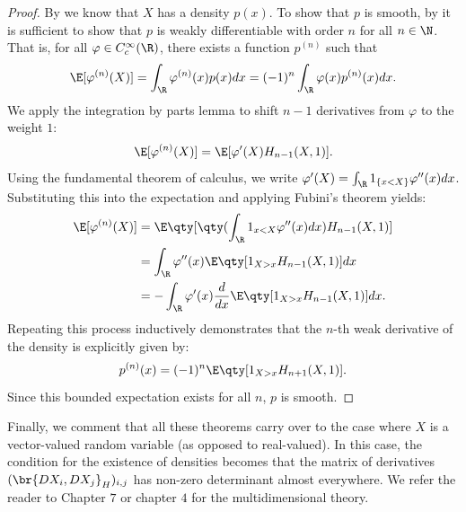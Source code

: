 \documentclass[
    a4paper,
    DIV=14,
    abstract=true,
    numbers=noenddot
]{scrartcl}
\begin{document}
\begin{proof}
By  we know that $X$ has a density $p(x)$. To show that $p$ is smooth, by  it is sufficient to show that $p$ is weakly differentiable with order $n$ for all $n \in \N$. That is, for all $\varphi\in C_c^\infty(\R)$, there exists a function $p^{(n)}$ such that
\begin{equation*}
\E[\varphi^{(n)}(X)]=\int_{\R}\varphi^{(n)}(x)p(x) dx=(-1)^n\int_{\R}\varphi(x) p^{(n)}(x) dx.
\end{equation*}
We apply the integration by parts lemma to shift $n-1$ derivatives from $\varphi$ to the weight $1$:
\begin{equation*}
\E[\varphi^{(n)}(X)] = \E[\varphi'(X)H_{n-1}(X,1)].
\end{equation*}
Using the fundamental theorem of calculus, we write $\varphi'(X) = \int_{\R} 1_{\{x < X\}} \varphi''(x) dx$. Substituting this into the expectation and applying Fubini's theorem yields:
\begin{align*}
\E[\varphi^{(n)}(X)] &= \E\qty[\qty(\int_{\R} 1_{{x < X}} \varphi''(x) dx) H_{n-1}(X,1)] \\
&= \int_{\R} \varphi''(x) \E\qty[1_{{X > x}} H_{n-1}(X,1)] dx \\
&= -\int_{\R} \varphi'(x) \frac{d}{dx} \E\qty[1_{{X > x}} H_{n-1}(X,1)] dx.
\end{align*}
Repeating this process inductively demonstrates that the $n$-th weak derivative of the density is explicitly given by:
\begin{equation*}
p^{(n)}(x) = (-1)^n \E\qty[1_{{X > x}} H_{n+1}(X,1)].
\end{equation*}
Since this bounded expectation exists for all $n$, $p$ is smooth.
\end{proof}
	Finally, we comment that all these theorems carry over to the case where $X$ is a vector-valued random variable (as opposed to real-valued). In this case, the condition
	for the existence of densities becomes that the matrix of derivatives $(\br{DX_i,DX_j}_{H})_{i,j}$ has non-zero determinant almost everywhere. We refer the reader to \cite{nualart2018introduction} 
	Chapter  $7$ or \cite{hairer2021introduction}  chapter $4$ for the multidimensional theory.


\end{document}
